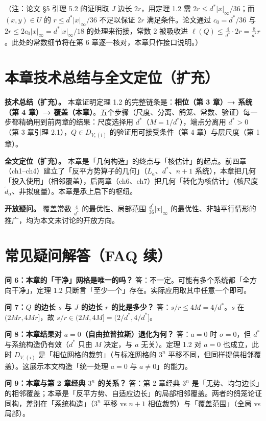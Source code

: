 \documentclass[a4paper,11pt,openany]{ctexbook}
\numberwithin{equation}{chapter}
\numberwithin{figure}{chapter}
\numberwithin{table}{chapter}
\begin{document}
（注：论文 §5 引理 5.2 的证明取 $J$ 边长 $2r$，用定理 1.2 需 $2r\le d^*|x|_\infty/36$；而 $(x,y)\in U$ 的 $r\le d^*|x|_\infty/36$ 不足以保证 $2r$ 满足条件。论文通过 $c_0=d^*/36$ 与 $2r\le2c_0|x|_\infty=d^*|x|_\infty/18$ 的处理来衔接，常数 $2$ 被吸收进 $\ell(Q)\le\frac4{d^*}\cdot2r=\frac8{d^*}r$。此处的常数细节将在第 6 章逐一核对，本章只作接口说明。）

\section{本章技术总结与全文定位（扩充）}

\textbf{技术总结（扩充）。} 本章证明定理 1.2 的完整链条是：\textbf{相位（第 3 章）→ 系统（第 4 章）→ 覆盖（本章）}。五个步骤（尺度、分离、鸽笼、常数、验证）每一步都精确用到前两章的结果：尺度选择用 $d^*$（$M=1/d^*$），端点分离用 $d^*>0$（第 3 章引理 2.1），$Q\in D_{V,(i)}$ 的验证用可接受条件（第 4 章）与层尺度（第 1 章）。

\textbf{全文定位（扩充）。} 本章是「几何构造」的终点与「核估计」的起点。前四章（ch1–ch4）建立了「反平方势算子的几何」（$L_a$、$d^*$、$n+1$ 系统），本章把几何「投入使用」（相邻覆盖），后两章（ch6、ch7）把几何「转化为核估计」（核尺度 $\widetilde d_\alpha$、非拟度量）。本章是承上启下的枢纽。

\textbf{开放疑问。} 覆盖常数 $\frac4{d^*}$ 的最优性、局部范围 $\frac{d^*}{36}|x|_\infty$ 的最优性、非轴平行情形的推广，均为本文未讨论的开放方向。

\section{常见疑问解答（FAQ 续）}

\textbf{问 6：本章的「干净」网格是唯一的吗？} 答：不一定。可能有多个系统都「全方向干净」，定理 1.2 只断言「至少一个」存在。实际应用取其中任意一个即可。

\textbf{问 7：$Q$ 的边长 $s$ 与 $J$ 的边长 $r$ 的比是多少？} 答：$s/r\le4M=4/d^*$。$s$ 在 $(2Mr,4Mr]$，故 $s/r\in(2M,4M]=(2/d^*,4/d^*]$。

\textbf{问 8：本章结果对 $a=0$（自由拉普拉斯）退化为何？} 答：$a=0$ 时 $\sigma=0$，但 $d^*$ 与系统构造仍有效（$d^*$ 只由 $M$ 决定，与 $a$ 无关）。定理 1.2 对 $a=0$ 也成立，此时 $D_{V,(i)}$ 是「相位网格的裁剪」（与标准网格的 $3^n$ 平移不同，但同样提供相邻覆盖）。这展示本文构造「统一处理 $a=0$ 与 $a\neq0$」的能力。

\textbf{问 9：本章与第 2 章经典 $3^n$ 的关系？} 答：第 2 章经典 $3^n$ 是「无势、均匀边长」的相邻覆盖；本章是「反平方势、自适应边长」的局部相邻覆盖。两者的鸽笼论证同构，差别在「系统构造」（$3^n$ 平移 vs $n+1$ 相位裁剪）与「覆盖范围」（全局 vs 局部）。
\end{document}
